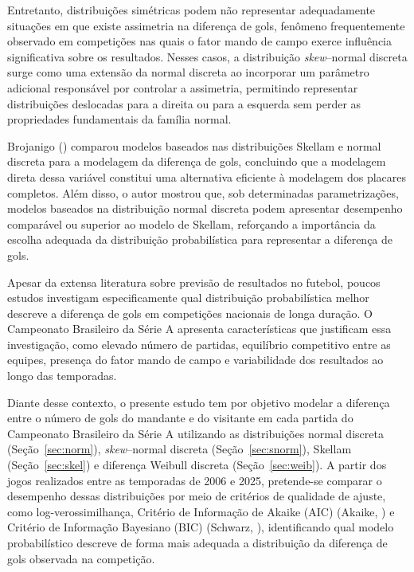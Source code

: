 \documentclass[12pt,a4paper]{article}\usepackage[]{graphicx}\usepackage[]{xcolor}
\begin{document}
Entretanto, distribuições simétricas podem não representar adequadamente situações em que existe assimetria na diferença de gols, fenômeno frequentemente observado em competições nas quais o fator mando de campo exerce influência significativa sobre os resultados. Nesses casos, a distribuição \textit{skew}--normal discreta surge como uma extensão da normal discreta ao incorporar um parâmetro adicional responsável por controlar a assimetria, permitindo representar distribuições deslocadas para a direita ou para a esquerda sem perder as propriedades fundamentais da família normal.

Brojanigo (\citeyear{brojanigo2013analysis}) comparou modelos baseados nas distribuições Skellam e normal discreta para a modelagem da diferença de gols, concluindo que a modelagem direta dessa variável constitui uma alternativa eficiente à modelagem dos placares completos. Além disso, o autor mostrou que, sob determinadas parametrizações, modelos baseados na distribuição normal discreta podem apresentar desempenho comparável ou superior ao modelo de Skellam, reforçando a importância da escolha adequada da distribuição probabilística para representar a diferença de gols.

Apesar da extensa literatura sobre previsão de resultados no futebol, poucos estudos investigam especificamente qual distribuição probabilística melhor descreve a diferença de gols em competições nacionais de longa duração. O Campeonato Brasileiro da Série A apresenta características que justificam essa investigação, como elevado número de partidas, equilíbrio competitivo entre as equipes, presença do fator mando de campo e variabilidade dos resultados ao longo das temporadas.

Diante desse contexto, o presente estudo tem por objetivo modelar a diferença entre o número de gols do mandante e do visitante em cada partida do Campeonato Brasileiro da Série A utilizando as distribuições normal discreta (Seção~\ref{sec:norm}), \textit{skew}--normal discreta (Seção~\ref{sec:snorm}), Skellam (Seção~\ref{sec:skel}) e diferença Weibull discreta (Seção~\ref{sec:weib}). A partir dos jogos realizados entre as temporadas de 2006 e 2025, pretende-se comparar o desempenho dessas distribuições por meio de critérios de qualidade de ajuste, como log-verossimilhança, Critério de Informação de Akaike (AIC) (Akaike, \citeyear{Akaike1974}) e Critério de Informação Bayesiano (BIC) (Schwarz, \citeyear{Schwarz1978}), identificando qual modelo probabilístico descreve de forma mais adequada a distribuição da diferença de gols observada na competição.
\end{document}
